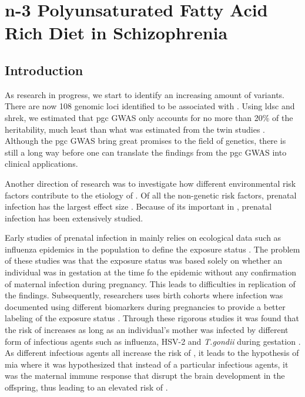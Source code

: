 \chapter{n-3 Polyunsaturated Fatty Acid Rich Diet in Schizophrenia}
\section{Introduction}
As research in  progress, we start to identify an increasing amount of variants. 
There are now 108 genomic loci identified to be associated with  \citep{Ripke2013}.
Using \gls{ldsc} and \gls{shrek}, we estimated that \gls{pgc}  \gls{GWAS} only accounts for no more than 20\% of the heritability, much least than what was estimated from the twin studies \citep{Lichtenstein2009,Sullivan2003}.
Although the \gls{pgc}  \gls{GWAS} bring great promises to the field of  genetics, there is still a long way before one can translate the findings from the \gls{pgc}  \gls{GWAS} into clinical applications.

Another direction of  research was to investigate how different environmental risk factors contribute to the etiology of .
Of all the non-genetic risk factors, prenatal infection has the largest effect size \citep{Sullivan2005}.
Because of its important in , prenatal infection has been extensively studied.

Early studies of prenatal infection in  mainly relies on ecological data such as influenza epidemics in the population to define the exposure status \citep{Brown2010}.
The problem of these studies was that the exposure status was based solely on whether an individual was in gestation at the time fo the epidemic without any confirmation of maternal infection during pregnancy.
This leads to difficulties in replication of the findings.
Subsequently, researchers uses birth cohorts where infection was documented using different biomarkers during pregnancies to provide a better labeling of the exposure status \citep{Brown2010}.
Through these rigorous studies it was found that the risk of  increases as long as an individual's mother was infected by different form of infectious agents such as influenza, HSV-2 and \textit{T.gondii} during gestation \citep{Brown2010}.
As different infectious agents all increase the risk of , it leads to the hypothesis of \gls{mia} \citep{Brown2010} where it was hypothesized that instead of a particular infectious agents, it was the maternal immune response that disrupt the brain development in the offspring, thus leading to an elevated risk of .

